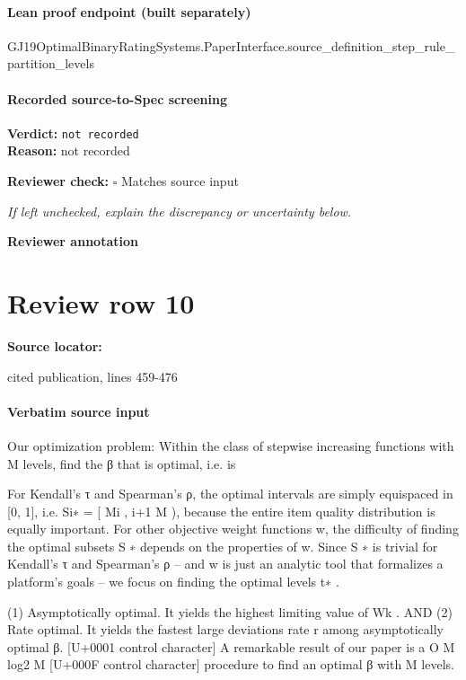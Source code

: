 \documentclass[10pt]{article}
\newcommand{\reviewerbox}{%
  \par\noindent\fbox{\parbox{0.96\linewidth}{\rule{0pt}{0.38in}}}\par
}
\newcommand{\reviewmatch}[1]{%
  \par\noindent\textbf{Reviewer check:} $\square$\; #1\par
  \noindent\emph{If left unchecked, explain the discrepancy or uncertainty below.}\par
}
\begin{document}
\paragraph{Lean proof endpoint (built separately)}\begin{ReviewVerbatim}
GJ19OptimalBinaryRatingSystems.PaperInterface.source_definition_step_rule_partition_levels
\end{ReviewVerbatim}

\paragraph{Recorded source-to-Spec screening}
\textbf{Verdict:} \texttt{not recorded}
\\
\textbf{Reason:} not recorded
\reviewmatch{Matches source input}
\noindent\textbf{Reviewer annotation}\par
\reviewerbox
\clearpage
\hypertarget{source-claim-b2f4ad11d62b1527}{}
\section*{Review row 10}
\textbf{Source locator:} {\footnotesize\raggedright cited publication, lines 459-\allowbreak{}476\par}
\paragraph{Verbatim source input}
\begin{ReviewVerbatim}
Our optimization problem: Within the class of
stepwise increasing functions with M levels, find the
β that is optimal, i.e. is

For Kendall’s τ and Spearman’s ρ, the optimal intervals are simply equispaced in [0, 1], i.e. Si∗ =
[ Mi , i+1
M ), because the entire item quality distribution is equally important. For other objective weight
functions w, the difficulty of finding the optimal subsets S ∗ depends on the properties of w. Since S ∗ is
trivial for Kendall’s τ and Spearman’s ρ – and w
is just an analytic tool that formalizes a platform’s
goals – we focus on finding the optimal levels t∗ .

(1) Asymptotically optimal. It yields the highest limiting value of Wk . AND
(2) Rate optimal. It yields the fastest large deviations rate r among asymptotically optimal β.
[U+0001 control character]
A remarkable result of our paper is a O M log2 M
[U+000F control character]
procedure to find an optimal β with M levels.
\end{ReviewVerbatim}
\end{document}
